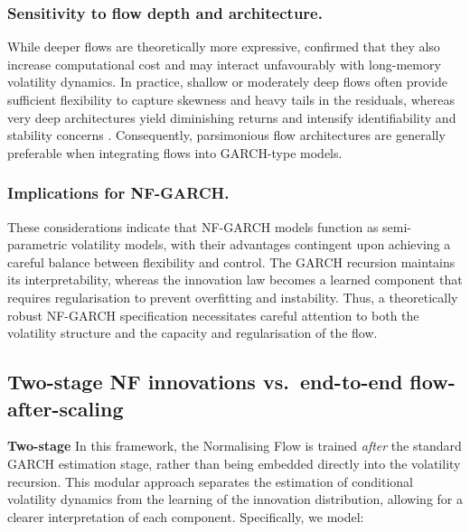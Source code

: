 \documentclass[oneside,12pt]{CUEDthesisPSnPDF}
\newcommand{\parencite}{\citep}
\begin{document}
\subsubsection{Sensitivity to flow depth and architecture.}
While deeper flows are theoretically more expressive, \parencite{papamakarios2021normalizing} confirmed that they also increase computational cost and may interact unfavourably with long-memory volatility dynamics. In practice, shallow or moderately deep flows often provide sufficient flexibility to capture skewness and heavy tails in the residuals, whereas very deep architectures yield diminishing returns and intensify identifiability and stability concerns\parencite{liu2020flows} . Consequently, parsimonious flow architectures are generally preferable when integrating flows into GARCH-type models.\\

\subsubsection{Implications for NF-GARCH.}
These considerations indicate that NF-GARCH models function as semi-parametric volatility models, with their advantages contingent upon achieving a careful balance between flexibility and control. The GARCH recursion maintains its interpretability, whereas the innovation law becomes a learned component that requires regularisation to prevent overfitting and instability. Thus, a theoretically robust NF-GARCH specification necessitates careful attention to both the volatility structure and the capacity and regularisation of the flow.\\


\subsection{Two-stage NF innovations vs.\ end-to-end flow-after-scaling}
\label{sec:nf-contrast}
\noindent
\textbf{Two-stage} In this framework, the Normalising Flow is trained \emph{after} the standard GARCH estimation stage, rather than being embedded directly into the volatility recursion. This modular approach separates the estimation of conditional volatility dynamics from the learning of the innovation distribution, allowing for a clearer interpretation of each component. Specifically, we model:\\
\end{document}
